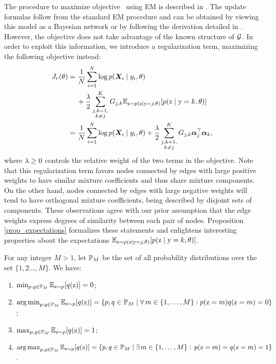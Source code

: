 The procedure to maximize objective~ using EM is described in . The update formulas follow from the standard EM procedure and can be obtained by viewing this model as a Bayesian network or by following the derivation detailed in . However, the objective  does not take advantage of the known structure of ${\mathcal{G}}$. In order to exploit this information, we introduce a regularization term, maximizing the following objective instead:
\begin{align}
\label{objective}
J_r(\theta) &= \frac{1}{N}\sum_{i=1}^N \log p({\bm{X}}_i \mid y_i, \theta) \nonumber\\ 
&\mathbin{\hphantom{=}}{}+ \frac{\lambda}{2} \sum_{\substack{j,k=1,\\k\neq j}}^{K} {G}_{j,k} \mathbb{E}_{{\textnormal{z}} \sim p({\textnormal{z}} \mid {\textnormal{y}}=j, \theta)} [ p({\textnormal{z}} \mid {\textnormal{y}}=k, \theta) ] \nonumber\\
&= \frac{1}{N}\sum_{i=1}^N \log p({\bm{X}}_i \mid y_i, \theta) + \frac{\lambda}{2} \sum_{\substack{j,k=1,\\k\neq j}}^{K} {G}_{j,k} {\bm{\alpha}}_j^\top {\bm{\alpha}}_k,
\end{align}
where $\lambda \geq 0$ controls the relative weight of the two terms in the objective. Note that this regularization term favors nodes connected by edges with large positive weights to have similar mixture coefficients and thus share mixture components. On the other hand, nodes connected by edges with large negative weights will tend to have orthogonal mixture coefficients, being described by disjoint sets of components. These observations agree with our prior assumption that the edge weights express degrees of similarity between each pair of nodes. Proposition \ref{prop_expectations} formalizes these statements and enlightens interesting properties about the expectations $\mathbb{E}_{{\textnormal{z}} \sim p({\textnormal{z}} \mid {\textnormal{y}}=j, \theta)} [ p({\textnormal{z}} \mid {\textnormal{y}}=k, \theta)]$.
\begin{proposition}
	\label{prop_expectations}
	For any integer $M>1$, let ${\mathbb{P}}_M$ be the set of all probability distributions over the set $\{1,2\dots,M\}$. We have:
	\begin{enumerate}
		\item $\min_{p,q \in {\mathbb{P}}_M} \mathbb{E}_{{\textnormal{z}}\sim p} [ q({\textnormal{z}}) ] = 0$; \label{prop_min}
		\item $\operatorname*{arg\,min}_{p,q \in {\mathbb{P}}_M} \mathbb{E}_{{\textnormal{z}}\sim p} [ q({\textnormal{z}}) ] = \{p,q \in {\mathbb{P}}_M \mid \forall \, m \in \{1,\dots,M\}: p({\textnormal{z}} = m)q({\textnormal{z}} = m)=0\}$; \label{prop_argmin}
		\item $\max_{p,q \in {\mathbb{P}}_M} \mathbb{E}_{{\textnormal{z}}\sim p} [ q({\textnormal{z}}) ] = 1$; \label{prop_max}
		\item $\operatorname*{arg\,max}_{p,q \in {\mathbb{P}}_M} \mathbb{E}_{{\textnormal{z}}\sim p} [ q({\textnormal{z}}) ] = \{p,q \in {\mathbb{P}}_M \mid \exists \, m \in \{1,\dots,M\} : \, p({\textnormal{z}} = m)=q({\textnormal{z}} = m)=1\}$ \label{prop_argmax}.
	\end{enumerate}
\end{proposition}
